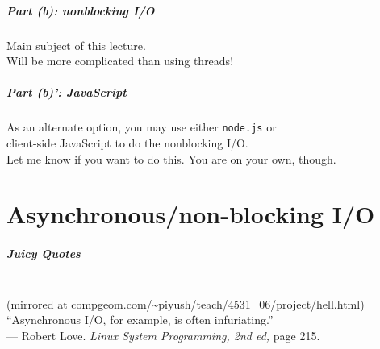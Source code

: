 \documentclass[aspectratio=43]{beamer}
\newenvironment{changemargin}[1]{%
  \begin{list}{}{%
    \setlength{\topsep}{0pt}%
    \setlength{\leftmargin}{#1}%
    \setlength{\rightmargin}{1em}
    \setlength{\listparindent}{\parindent}%
    \setlength{\itemindent}{\parindent}%
    \setlength{\parsep}{\parskip}%
  }%
  \item[]}{\end{list}}
\begin{document}

\begin{frame}
  \frametitle{Part (b): nonblocking I/O}
  \begin{changemargin}{2em}
    Main subject of this lecture. \\

    Will be more complicated than using threads!
  \end{changemargin}
\end{frame}


\begin{frame}
  \frametitle{Part (b)': JavaScript}
  \begin{changemargin}{2em}
    As an alternate option, you may use either {\tt node.js} or\\ client-side
    JavaScript to do the nonblocking I/O.\\[1em]

    Let me know if you want to do this. You are on your own, though.
  \end{changemargin}
\end{frame}

\part{Asynchronous/non-blocking I/O}
\frame{\partpage}

\begin{frame}
  \frametitle{Juicy Quotes}
  \begin{changemargin}{2em}

  \\
{\scriptsize (mirrored at \url{compgeom.com/~piyush/teach/4531_06/project/hell.html})}
   \\[3em]

   ``Asynchronous I/O, for example, is often infuriating.''\\
--- Robert Love. {\em Linux System Programming, 2nd ed, } page 215.
  
  \end{changemargin}
\end{frame}
\end{document}

